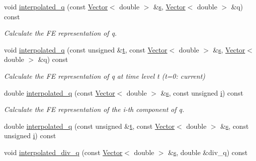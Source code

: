 \begin{DoxyCompactItemize}
void \hyperlink{classoomph_1_1AxisymmetricPoroelasticityEquations_a412b654ecb7e8ba819877db02a382dfd}{interpolated\+\_\+q} (const \hyperlink{classoomph_1_1Vector}{Vector}$<$ double $>$ \&\hyperlink{cfortran_8h_ab7123126e4885ef647dd9c6e3807a21c}{s}, \hyperlink{classoomph_1_1Vector}{Vector}$<$ double $>$ \&q) const
\begin{DoxyCompactList}\small\item\em Calculate the FE representation of q. \end{DoxyCompactList}\item 
void \hyperlink{classoomph_1_1AxisymmetricPoroelasticityEquations_a81044677b94131e3bb8f38462ca4467a}{interpolated\+\_\+q} (const unsigned \&\hyperlink{cfortran_8h_af6f0bd3dc13317f895c91323c25c2b8f}{t}, const \hyperlink{classoomph_1_1Vector}{Vector}$<$ double $>$ \&\hyperlink{cfortran_8h_ab7123126e4885ef647dd9c6e3807a21c}{s}, \hyperlink{classoomph_1_1Vector}{Vector}$<$ double $>$ \&q) const
\begin{DoxyCompactList}\small\item\em Calculate the FE representation of q at time level t (t=0\+: current) \end{DoxyCompactList}\item 
double \hyperlink{classoomph_1_1AxisymmetricPoroelasticityEquations_ac16ae57560ec39b2d381afd5f1b06dc2}{interpolated\+\_\+q} (const \hyperlink{classoomph_1_1Vector}{Vector}$<$ double $>$ \&\hyperlink{cfortran_8h_ab7123126e4885ef647dd9c6e3807a21c}{s}, const unsigned \hyperlink{cfortran_8h_adb50e893b86b3e55e751a42eab3cba82}{i}) const
\begin{DoxyCompactList}\small\item\em Calculate the FE representation of the i-\/th component of q. \end{DoxyCompactList}\item 
double \hyperlink{classoomph_1_1AxisymmetricPoroelasticityEquations_a6bc8cb3a6f8e08f8e23c220fc24ad38e}{interpolated\+\_\+q} (const unsigned \&\hyperlink{cfortran_8h_af6f0bd3dc13317f895c91323c25c2b8f}{t}, const \hyperlink{classoomph_1_1Vector}{Vector}$<$ double $>$ \&\hyperlink{cfortran_8h_ab7123126e4885ef647dd9c6e3807a21c}{s}, const unsigned \hyperlink{cfortran_8h_adb50e893b86b3e55e751a42eab3cba82}{i}) const
\item 
void \hyperlink{classoomph_1_1AxisymmetricPoroelasticityEquations_a82fbed7cdfe8bc66f3bdd43460d2df00}{interpolated\+\_\+div\+\_\+q} (const \hyperlink{classoomph_1_1Vector}{Vector}$<$ double $>$ \&\hyperlink{cfortran_8h_ab7123126e4885ef647dd9c6e3807a21c}{s}, double \&div\+\_\+q) const

\end{DoxyCompactItemize}
